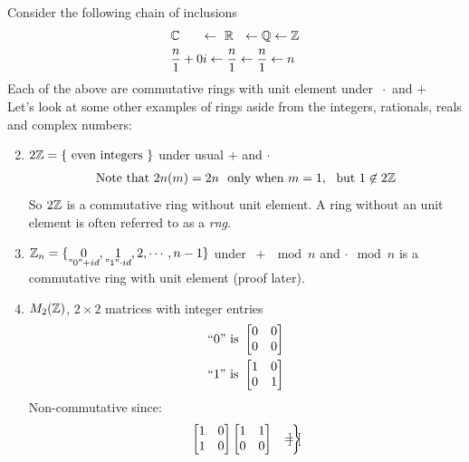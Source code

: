 Consider the following chain of inclusions 
\begin{align}
    &\mathbb{C} \ \ \ \ \ \leftarrow \ {\mathbb{ R}} \ \ \leftarrow \mathbb{Q} \leftarrow {\mathbb{ Z}}  \nonumber \\
    &\frac{n}{1}+0i \leftarrow \frac{n}{1} \leftarrow \frac{n}{1} \leftarrow n \nonumber
\end{align}
Each of the above are commutative rings with unit element under $\ \cdot$ and $+$ \steezybreak\\
Let's look at some other examples of rings aside from the integers, rationals, reals and complex numbers:
\begin{enumerate}\setcounter{enumi}{1}
    \item $2{\mathbb{ Z}}=\{\text{ even integers }\}$ under usual $+$ and $\cdot$ \ \ \\
    \begin{align}
        \text{Note that } 2n(m)=2n  \ \text{ only when }m=1, \ \text{ but } 1\not\in 2{\mathbb{ Z}} \nonumber
    \end{align}
    So $2{\mathbb{ Z}}$ is a commutative ring without unit element. A ring without an unit element is often referred to as a \textit{rng}.
    \item ${\mathbb{ Z}}_n=\{\underset{"0" + id}{0},\underset{"1" \cdot id}{1},2,\cdots,n-1\}$ under $\ +\mod n$ and $\cdot \mod n$ is a commutative ring with unit element (proof later).
    \item $M_2({\mathbb{ Z}})$, $2\times 2$ matrices with integer entries
    \begin{align}
        ``0" \text{ is }\begin{bmatrix}0&0\\0&0\end{bmatrix} \nonumber \\
        ``1" \text{ is }\begin{bmatrix}1&0\\0&1\end{bmatrix} \nonumber 
    \end{align}
    Non-commutative since:
    \begin{equation*}
        \begin{drcases}
            \begin{bmatrix}
                    1&0\\1&0
            \end{bmatrix}
            \begin{bmatrix}
                    1&1\\0&0
            \end{bmatrix} &= \begin{bmatrix}

\end{bmatrix}
\end{drcases}
\end{equation*}
\end{enumerate}

